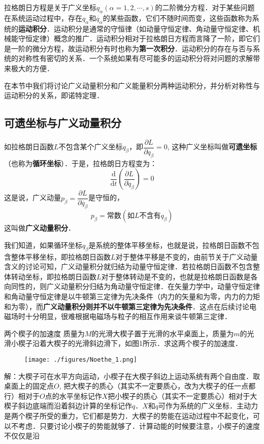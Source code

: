 

拉格朗日方程是关于广义坐标$q_\alpha(\alpha=1,2,\cdots,s)$的二阶微分方程．对于某些问题在系统运动过程中，存在$q_\alpha$和$\dot{q_\alpha}$的某些函数，它们不随时间而变，这些函数称为系统的\textbf{运动积分}．运动积分是通常的守恒律（如动量守恒定律、角动量守恒定律、机械能守恒定律）概念的推广．运动积分相对于拉格朗日方程而言降了一阶，即它们是一阶的微分方程，故运动积分有时也称为\textbf{第一次积分}．运动积分的存在与否与系统的对称性有密切的关系．一个系统如果有尽可能多的运动积分将对问题的求解带来极大的方便．

在本节中我们将讨论广义动量积分和广义能量积分两种运动积分，并分析对称性与运动积分的关系，即诺特定理．

\subsection{可遗坐标与广义动量积分}

如拉格朗日函数$L$不包含某个广义坐标$q_\beta$，即$\dfrac{\partial L}{\partial q_\beta}=0$, 这种广义坐标叫做\textbf{可遗坐标}（也称为\textbf{循环坐标}）．于是，拉格朗日方程变为：
\begin{equation}
\frac{\mathrm{d}}{\mathrm{d} t}\left(\frac{\partial L}{\partial \dot{q}_{\beta}}\right)=0
\end{equation}
这是说，广义动量$p_\beta=\dfrac{\partial L} {\partial \dot{q_\beta}}$是守恒的，
\begin{equation}
p_\beta=常数(如L不含有q_\beta)
\end{equation}
这叫做\textbf{广义动量积分}．

我们知道，如果循环坐标$q_\beta$是系统的整体平移坐标，也就是说，拉格朗日函数不包含整体平移坐标，即拉格朗日函数$L $对于整体平移是不变的，由前节关于广义动量含义的讨论可知，广义动量积分就归结为动量守恒定律．若拉格朗日函数不包含整体转动坐标，即拉格朗日函数$L$对于整体转动是不变的，也就是拉格朗日函数是各向同性的，则广义动量积分归结为角动量守恒定律．在矢量力学中，动量守恒定律和角动量守恒定律是以牛顿第三定律为先决条件（内力的矢量和为零，内力的力矩和为零），而\textbf{广义动量积分则并不以牛顿第三定律为先决条件}．这点在后续讨论电磁场时十分明显，很难根据电磁场与粒子的相互作用来谈牛顿第三定律．

\begin{example}{两个楔子的加速度}
质量为$M $的光滑大楔子置于光滑的水平桌面上，质量为$m$的光滑小楔子沿着大楔子的光滑斜边滑下，如图1所示．求这两个楔子的加速度．
\begin{figure}[ht]
\centering
\texttt{[image: ./figures/Noethe\_1.png]}
\caption{} \label{Noethe_fig1}
\end{figure}

解：大楔子可在水平方向运动，小楔子在大楔子斜边上运动系统有两个自由度．取桌面上的固定点$O$, 把大楔子的质心（其实不一定要质心，改为大楔子的任一点都行）相对于$O$点的水平坐标记作$X $把小楔子的质心（其实不一定要质心）相对于大楔子斜边底端而沿着斜边计算的坐标记作$q$．$X $和$q $可作为系统的广义坐标．主动力是两个楔子所受的重力，它们都是势力．大楔子的势能在运动过程中不起变化，可以不考虑．只要讨论小楔子的势能就够了．计算动能的时候要注意，小楔子的速度不仅仅是沿
\end{example}

